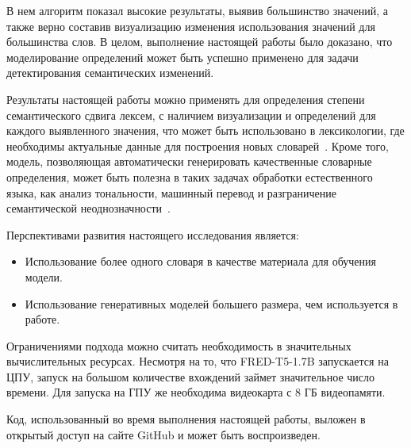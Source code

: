 \documentclass[LI,VKR]{HSEUniversity}
\begin{document}
В нем алгоритм показал высокие результаты, выявив большинство значений,
а также верно составив визуализацию изменения использования значений для большинства слов.
В целом, выполнение настоящей работы было доказано, что моделирование определений может быть
успешно применено для задачи детектирования семантических изменений.


Результаты настоящей работы можно применять для определения степени семантического сдвига лексем,
с наличием визуализации и определений для каждого выявленного значения,
что может быть использовано в лексикологии,
где необходимы актуальные данные для построения новых словарей~\cite{DefinitionGenerationMainArticle}.
Кроме того, модель, позволяющая автоматически генерировать качественные словарные определения,
может быть полезна в таких задачах обработки естественного языка,
как анализ тональности, машинный перевод и разграничение семантической
неоднозначности~\cite{DefinitionModelingReviewAndDatasetAnalysis}.

Перспективами развития настоящего исследования является:
\begin{itemize}
    \item Использование более одного словаря в качестве материала для обучения модели.
    \item Использование генеративных моделей большего размера, чем используется в работе.
\end{itemize}

Ограничениями подхода можно считать необходимость в значительных вычислительных ресурсах.
Несмотря на то, что FRED-T5-1.7B запускается на ЦПУ, запуск на большом количестве вхождений
займет значительное число времени.
Для запуска на ГПУ же необходима видеокарта с 8 ГБ видеопамяти.

Код, использованный во время выполнения настоящей работы, выложен в открытый доступ
на сайте GitHub и может быть воспроизведен.~

\printbibliography
\appendix

\end{document}
